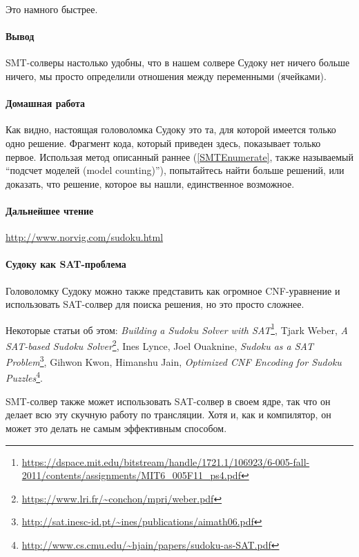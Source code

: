 Это намного быстрее.

\paragraph{Вывод}

\ac{SMT}-солверы настолько удобны, что в нашем солвере Судоку нет ничего больше ничего, мы просто определили
отношения между переменными (ячейками).

\paragraph{Домашная работа}

Как видно, настоящая головоломка Судоку это та, для которой имеется только одно решение.
Фрагмент кода, который приведен здесь, показывает только первое.
Использая метод описанный раннее (\ref{SMTEnumerate}, также называемый ``подсчет моделей (model counting)''), 
попытайтесь найти больше решений, или доказать, что решение, которое вы нашли, единственное возможное.

\paragraph{Дальнейшее чтение}

\url{http://www.norvig.com/sudoku.html}

\paragraph{Судоку как \ac{SAT}-проблема}

Головоломку Судоку можно также представить как огромное \ac{CNF}-уравнение и использовать \ac{SAT}-солвер для поиска решения,
но это просто сложнее.

Некоторые статьи об этом:
\textit{Building a Sudoku Solver with SAT}\footnote{\url{https://dspace.mit.edu/bitstream/handle/1721.1/106923/6-005-fall-2011/contents/assignments/MIT6_005F11_ps4.pdf}},
Tjark Weber, \textit{A SAT-based Sudoku Solver}\footnote{\url{https://www.lri.fr/~conchon/mpri/weber.pdf}},
Ines Lynce, Joel Ouaknine, \textit{Sudoku as a SAT Problem}\footnote{\url{http://sat.inesc-id.pt/~ines/publications/aimath06.pdf}},
Gihwon Kwon, Himanshu Jain, \textit{Optimized CNF Encoding for Sudoku Puzzles}\footnote{\url{http://www.cs.cmu.edu/~hjain/papers/sudoku-as-SAT.pdf}}.

\ac{SMT}-солвер также может использовать \ac{SAT}-солвер в своем ядре, так что он делает всю эту скучную работу
по трансляции.
Хотя и, как и компилятор, он может это делать не самым эффективным способом.

